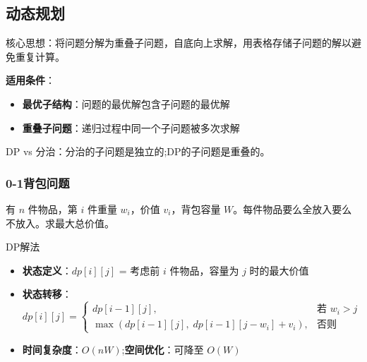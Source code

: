 \subsection{动态规划}

核心思想：将问题分解为重叠子问题，自底向上求解，用表格存储子问题的解以避免重复计算。

\textbf{适用条件}：
\begin{itemize}
    \item \textbf{最优子结构}：问题的最优解包含子问题的最优解
    \item \textbf{重叠子问题}：递归过程中同一个子问题被多次求解
\end{itemize}

DP vs 分治：分治的子问题是独立的;DP的子问题是重叠的。

\subsubsection{0-1背包问题}

有 \(n\) 件物品，第 \(i\) 件重量 \(w_i\)，价值 \(v_i\)，背包容量 \(W\)。每件物品要么全放入要么不放入。求最大总价值。

\begin{mydefinition}{DP解法}
\begin{itemize}
    \item \textbf{状态定义}：\(dp[i][j]\) = 考虑前 \(i\) 件物品，容量为 \(j\) 时的最大价值
    \item \textbf{状态转移}：
    \[
    dp[i][j] = \begin{cases}
    dp[i-1][j], & \text{若 } w_i > j \\
    \max(dp[i-1][j],\; dp[i-1][j-w_i] + v_i), & \text{否则}
    \end{cases}
    \]
    \item \textbf{时间复杂度}：\(O(nW)\);\textbf{空间优化}：可降至 \(O(W)\)
\end{itemize}
\end{mydefinition}

